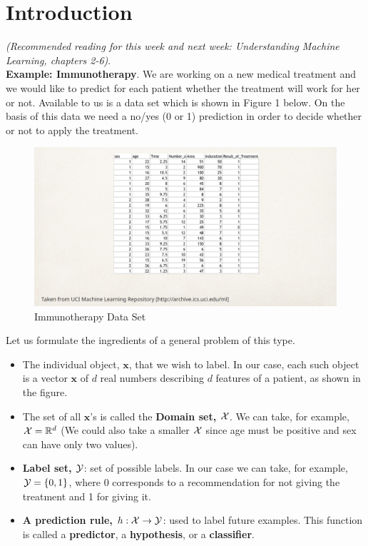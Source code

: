 

\section{Introduction}

{\it(Recommended reading for this week and next week: Understanding Machine Learning, chapters 2-6)}.\\

\textbf{Example: Immunotherapy}. We are working on a new medical treatment and we would like to predict for each patient whether the treatment will work for her or not.
Available to us is a data set which is shown in Figure 1 below. On the basis of this data we need a no/yes (0 or 1) prediction in order to decide whether or not to apply the treatment.
\begin{figure}[h!]
  \centering
    \includegraphics[scale=0.3]{ImmunotherapyDataSet.png}
    \caption{Immunotherapy Data Set}
\end{figure}
Let us formulate the ingredients of a general problem of this type.

\begin{itemize}
 \item The individual object, $\mathbf{x}$, that we wish to label. In our case, each such object is a vector $\mathbf{x}$ of $d$ real numbers describing $d$ features of a patient, as shown in the figure.
 \item The set of all $\mathbf{x}$'s is called the \textbf{Domain set, $\mathcal{X}$}. We can take, for example,  $\mathcal{X}= \mathbb{R}^d$ (We could also take a smaller $\mathcal{X}$ since age must be positive and sex can have only two values).
 \item \textbf{Label set, $\mathcal{Y}$}: set of possible labels. In our case we can take, for example,  $\mathcal{Y}=\{0,1\}$, where $0$ corresponds to a recommendation for not giving the treatment and 1 for giving it.
 \item \textbf{A prediction rule, $h:\mathcal{X}\to \mathcal{Y}$}: used to label future examples. This function is called a \textbf{predictor}, a \textbf{hypothesis}, or a  \textbf{classifier}.
\end{itemize}


